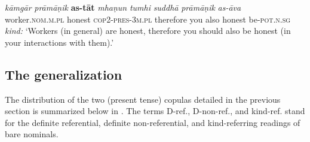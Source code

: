 \documentclass[output=paper,hidelinks]{langscibook}
\begin{document}
\begin{exe}
\begin{xlist}
\begin{xlist}
\begin{exe}
\begin{exe}
\begin{exe}
\gll \emph{kāmgār} \emph{prāmāṇik} \textbf{as-tāt} \emph{mhaṇun} \emph{tumhi} \emph{suddhā} \emph{prāmāṇik} \emph{as-āva}\\
worker.\textsc{nom.m.pl} honest \textsc{cop2-pres-3m.pl} therefore you also honest be-\textsc{pot.n.sg}\\
\glt \emph{kind:} `Workers (in general) are honest, therefore you should also be honest (in your interactions with them).' \label{indworker3}
\z
{}

%

\subsection{The generalization}
The distribution of the two (present tense) copulas detailed in the previous section is summarized below in . The terms D-ref., D-non-ref., and kind-ref. stand for the definite referential, definite non-referential, and kind-referring readings of bare nominals.


\end{exe}
\end{exe}
\end{exe}
\end{xlist}
\end{xlist}
\end{exe}
\end{document}
